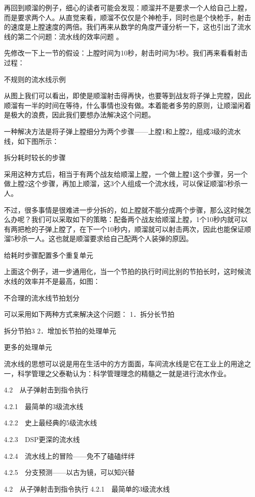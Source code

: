 \documentclass[12pt,UTF8]{ctexbook}
\begin{document}
再回到顺溜的例子，细心的读者可能会发现：顺溜并不是要求一个人给自己上膛，而是要求两个人。从直觉来看，顺溜不仅仅是个神枪手，同时也是个快枪手，射击的速度是上膛速度的两倍。我们再来从数学的角度严谨分析一下，这也引出了流水线的第二个问题：流水线的效率问题 。

先修改一下上一节的假设：上膛时间为10秒，射击时间为5秒。我们再来看看射击过程：

不规则的流水线示例

从图上我们可以看出，即使是顺溜射击得再快，也要等到战友将子弹上完膛，因此顺溜有一半的时间在等待，什么事情也没有做。本着能者多劳的原则，让顺溜闲着是极大的浪费，因此我们要想办法解决这个问题。

一种解决方法是将子弹上膛细分为两个步骤——上膛1和上膛2，组成3级的流水线，如下图所示：

拆分耗时较长的步骤

采用这种方式后，相当于有两个战友给顺溜上膛，一个做上膛1这个步骤，另一个做上膛2这个步骤，再加上顺溜，这3个人组成一个流水线，可以保证顺溜5秒杀一人。

不过，很多事情是很难进一步分拆的，如上膛就不能分成两个步骤，那么这时候怎么办呢？我们可以采取如下的策略：配备两个战友给顺溜上膛，1个10秒内就可以有两把枪的子弹上膛了，在下一个10秒内，顺溜就可以射击两次，因此也能保证顺溜5秒杀一人。这也就是顺溜要求给自己配两个人装弹的原因。

给耗时步骤配置多个重复单元

上面这个例子，进一步通用化，当一个节拍的执行时间比别的节拍长时，这时候流水线的效率并不是最高，如图：

不合理的流水线节拍划分

可以采用如下两种方式来解决这个问题：
1．拆分长节拍

拆分节拍3
2．增加长节拍的处理单元

更多的处理单元

流水线的思想可以说是用在生活中的方方面面，车间流水线是它在工业上的用途之一，科学管理之父泰勒认为：科学管理理念的精髓之一就是进行流水作业。



4.2　从子弹射击到指令执行

4.2.1　最简单的3级流水线

4.2.2　史上最经典的5级流水线

4.2.3　DSP更深的流水线

4.2.4　流水线上的冒险——免不了磕磕绊绊

4.2.5　分支预测——以古为镜，可以知兴替


4.2　从子弹射击到指令执行
4.2.1　最简单的3级流水线
\end{document}

